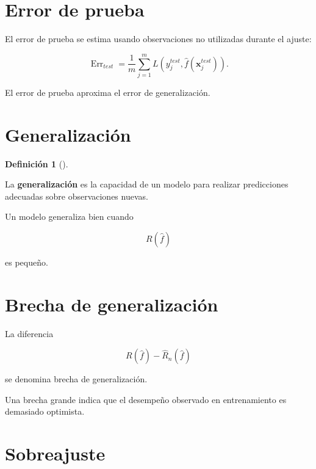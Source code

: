 \documentclass[
  spanish,
  10.5pt,
  letterpaper,
  DIV=11,
  numbers=noendperiod,
  oneside,
  open=any]{scrreprt}
\theoremstyle{definition}
\newtheorem{definition}{Definición}[chapter]
\theoremstyle{definition}
\theoremstyle{plain}
\theoremstyle{remark}
\begin{document}
\section*{Error de prueba}\label{error-de-prueba}


El error de prueba se estima usando observaciones no utilizadas durante
el ajuste:

\[
\operatorname{Err}_{test}
=
\frac{1}{m}
\sum_{j=1}^{m}
L(
y_j^{test},
\widehat{f}(\mathbf{x}_j^{test})
).
\]

El error de prueba aproxima el error de generalización.

\section*{Generalización}\label{generalizaciuxf3n}


\begin{definition}[]\protect\hypertarget{def-generalizacion}{}\label{def-generalizacion}

La \textbf{generalización} es la capacidad de un modelo para realizar
predicciones adecuadas sobre observaciones nuevas.

\end{definition}

Un modelo generaliza bien cuando

\[
R(\widehat{f})
\]

es pequeño.

\section*{Brecha de generalización}\label{brecha-de-generalizaciuxf3n}


La diferencia

\[
R(\widehat{f})
-
\widehat{R}_n(\widehat{f})
\]

se denomina brecha de generalización.

Una brecha grande indica que el desempeño observado en entrenamiento es
demasiado optimista.

\section*{Sobreajuste}\label{sobreajuste}
\end{document}
